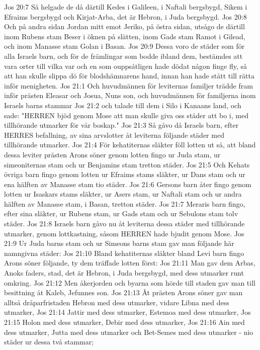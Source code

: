 Jos 20:7  Så helgade de då därtill Kedes i Galileen, i Naftali bergsbygd, Sikem i Efraims bergsbygd och Kirjat-Arba, det är Hebron, i Juda bergsbygd.
Jos 20:8  Och på andra sidan Jordan mitt emot Jeriko, på östra sidan, utsågo de därtill inom Rubens stam Beser i öknen på slätten, inom Gads stam Ramot i Gilead, och inom Manasse stam Golan i Basan.
Jos 20:9  Dessa voro de städer som för alla Israels barn, och för de främlingar som bodde ibland dem, bestämdes att vara orter till vilka var och en som ouppsåtligen hade dödat någon finge fly, så att han skulle slippa dö för blodshämnarens hand, innan han hade stått till rätta inför menigheten.
Jos 21:1  Och huvudmännen för leviternas familjer trädde fram inför prästen Eleasar och Josua, Nuns son, och huvudmännen för familjerna inom Israels barns stammar
Jos 21:2  och talade till dem i Silo i Kanaans land, och sade: "HERREN bjöd genom Mose att man skulle giva oss städer att bo i, med tillhörande utmarker för vår boskap."
Jos 21:3  Så gåvo då Israels barn, efter HERRES befallning, av sina arvslotter åt leviterna följande städer med tillhörande utmarker.
Jos 21:4  För kehatiternas släkter föll lotten ut så, att bland dessa leviter prästen Arons söner genom lotten fingo ur Juda stam, ur simeoniternas stam och ur Benjamins stam tretton städer.
Jos 21:5  Och Kehats övriga barn fingo genom lotten ur Efraims stams släkter, ur Dans stam och ur ena hälften av Manasse stam tio städer.
Jos 21:6  Gersons barn åter fingo genom lotten ur Isaskars stams släkter, ur Asers stam, ur Naftali stam och ur andra hälften av Manasse stam, i Basan, tretton städer.
Jos 21:7  Meraris barn fingo, efter sina släkter, ur Rubens stam, ur Gads stam och ur Sebulons stam tolv städer.
Jos 21:8  Israels barn gåvo nu åt leviterna dessa städer med tillhörande utmarker, genom lottkastning, såsom HERREN hade bjudit genom Mose.
Jos 21:9  Ur Juda barns stam och ur Simeons barns stam gav man följande här namngivna städer:
Jos 21:10  Bland kehatiternas släkter bland Levi barn fingo Arons söner följande, ty dem träffade lotten först:
Jos 21:11  Man gav dem Arbas, Anoks faders, stad, det är Hebron, i Juda bergsbygd, med dess utmarker runt omkring.
Jos 21:12  Men åkerjorden och byarna som hörde till staden gav man till besittning åt Kaleb, Jefunnes son.
Jos 21:13  Åt prästen Arons söner gav man alltså dråparfristaden Hebron med dess utmarker, vidare Libna med dess utmarker,
Jos 21:14  Jattir med dess utmarker, Estemoa med dess utmarker,
Jos 21:15  Holon med dess utmarker, Debir med dess utmarker,
Jos 21:16  Ain med dess utmarker, Jutta med dess utmarker och Bet-Semes med dess utmarker - nio städer ur dessa två stammar;
